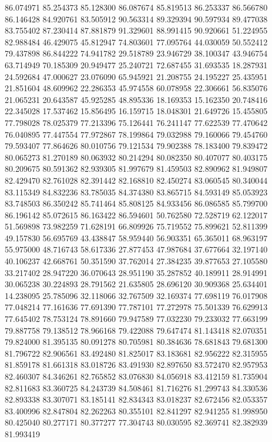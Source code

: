 86.074971
85.254373
85.128300
86.087674
85.819513
86.253337
86.566780
86.146428
84.920761
83.505912
90.563314
89.329394
90.597934
89.477038
83.755402
87.230414
87.881879
91.329601
88.991415
90.920661
51.224955
82.988484
46.429075
45.812947
74.803601
77.095764
44.030059
50.552412
79.437898
86.844222
74.941782
29.518789
23.946729
38.100347
43.946754
63.714949
70.185309
20.949477
25.240721
72.687455
31.693535
18.287931
24.592684
47.000627
23.076090
65.945921
21.208755
24.195227
25.435951
21.851604
48.609962
22.286353
45.974558
60.078958
22.306661
56.835076
21.065231
20.643587
45.925285
48.895336
18.169353
15.162350
20.748416
22.345028
17.537462
15.856495
16.159715
18.048301
21.649726
15.455805
77.798028
78.025379
77.213396
75.126441
76.241147
77.622539
77.470642
76.040895
77.447554
77.972867
78.199864
79.032988
79.160066
79.454760
79.593407
77.864626
80.010756
79.121534
79.902388
78.183400
79.839472
80.065273
81.270189
80.063932
80.214294
80.082350
80.407077
80.403175
80.209675
80.591362
82.939305
81.997679
81.459503
82.890962
81.949807
82.429470
82.761028
82.391442
82.168810
82.450274
83.060545
80.340044
83.115349
84.832236
83.785035
84.374380
83.865715
84.593149
85.053923
83.748503
86.350242
85.741464
85.808125
84.933456
86.086585
85.799700
86.196142
85.072615
86.163422
86.594601
50.762580
72.528719
62.122017
51.569898
73.982259
71.628191
66.809926
75.719552
75.899621
52.811399
49.157830
56.695769
43.438847
58.959440
56.903351
65.365011
68.963197
55.975000
48.716743
58.617336
27.877453
47.987684
37.677664
32.197140
40.106237
42.668761
50.351590
37.762014
27.384235
39.877653
27.105580
33.217402
28.947220
36.070643
28.951190
35.287852
40.189911
28.914991
30.065238
30.224893
28.791562
21.635805
28.696120
30.909368
25.634401
14.238095
25.785096
32.118066
32.767509
32.169374
77.698119
76.017908
77.048214
77.161636
77.691390
77.787101
77.272978
75.501339
76.629913
77.645402
78.753124
78.891660
79.947589
77.032230
79.233032
77.663199
79.887758
79.138512
78.966168
79.422088
79.647474
81.143418
82.070351
79.824000
81.395135
80.091278
80.705981
80.384636
78.681843
79.681300
81.796722
82.906561
83.492480
81.825017
83.183681
82.956222
82.315955
81.859178
81.661318
83.018726
83.491930
82.897650
83.572470
82.957953
82.460307
84.346261
82.765852
83.076830
84.056918
83.412159
81.735904
82.811683
83.360725
84.243739
84.508461
81.716276
81.299743
84.330536
82.893338
83.307071
83.185141
82.834343
83.018237
82.672456
82.053357
83.400996
82.847804
82.262263
80.355101
82.841297
82.941255
81.998950
80.425040
80.277171
80.377277
77.304743
80.030595
82.369741
82.382939
81.993419

